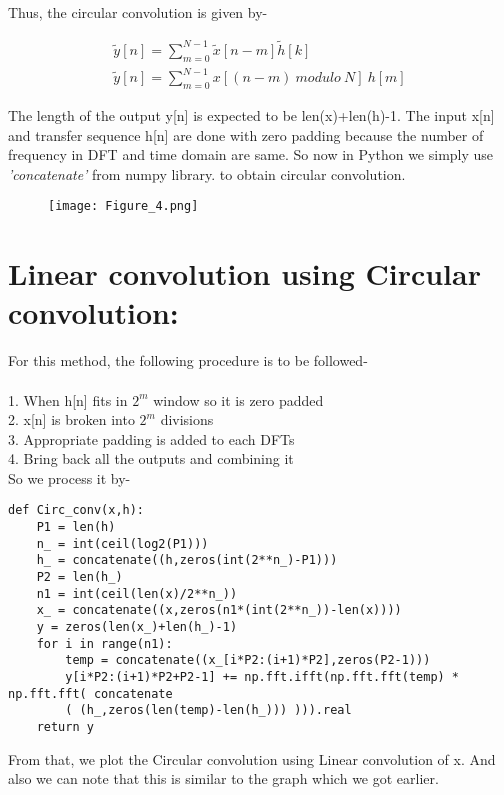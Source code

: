 \documentclass[12pt]{article}
\begin{document}
Thus, the circular convolution is given by-

\begin{equation}
  \begin{aligned}
    \tilde{y}[n] = \sum_{m=0}^{N-1} \tilde{x}[n-m]\tilde{h}[k]\\
    \tilde{y}[n] = \sum_{m=0}^{N-1} x[(n-m) ~\textit{modulo}~ N]~h[m]
  \end{aligned}
\end{equation}

The length of the output y[n] is expected to be len(x)+len(h)-1. The input x[n] and transfer sequence h[n] are done with zero padding because the number of frequency in DFT and time domain are same. So now in Python we simply use \textit{'concatenate'} from numpy library. to obtain circular convolution.

\begin{figure}[h!]
\centering
\texttt{[image: Figure\_4.png]}
\label{fig:exemplo}
\end{figure}


\newpage
\section*{Linear convolution using Circular convolution:}

For this method, the following procedure is to be followed-\\\\
1. When h[n] fits in $2^m$ window so it is zero padded\\
2. x[n] is broken into $2^m$ divisions\\
3. Appropriate padding is added to each DFTs\\
4. Bring back all the outputs and combining it\\
So we process it by-
\begin{verbatim}
def Circ_conv(x,h):
    P1 = len(h)
    n_ = int(ceil(log2(P1)))
    h_ = concatenate((h,zeros(int(2**n_)-P1)))
    P2 = len(h_)
    n1 = int(ceil(len(x)/2**n_))
    x_ = concatenate((x,zeros(n1*(int(2**n_))-len(x))))
    y = zeros(len(x_)+len(h_)-1)
    for i in range(n1):
        temp = concatenate((x_[i*P2:(i+1)*P2],zeros(P2-1)))
        y[i*P2:(i+1)*P2+P2-1] += np.fft.ifft(np.fft.fft(temp) * np.fft.fft( concatenate
        ( (h_,zeros(len(temp)-len(h_))) ))).real
    return y
\end{verbatim}

From that, we plot the Circular convolution using Linear convolution of x. And also we can note that this is similar to the graph which we got earlier. 
\end{document}
